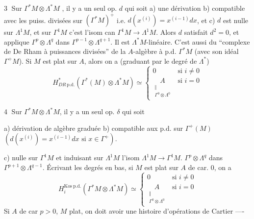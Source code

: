 \textcircled{3} Sur $\Gamma^*M\otimes\Lambda^*M$ , il y a un seul op. $d$ qui soit  a) une dérivation     b) compatible avec les puiss. divisées sur $(\Gamma^*M)^+$ i.e. $d(x^{(i)})=x^{(i-1)}dx$, et c) $d$ est nulle sur $\Lambda^1M$, et sur $\Gamma^1M$ c'est l'isom can $\Gamma^1M\longrightarrow\Lambda^1M$. Alors $d$ satisfait $d^2=0$, et applique $\Gamma^p\otimes\Lambda^q$ dans $\Gamma^{p-1}\otimes\Lambda^{q+1}$. Il est $\Lambda^*M$-linéaire. C'est aussi du ``complexe de De Rham à puissances divisées'' de la $A$-algèbre à p.d. $\Gamma^*M$ (avec son idéal $\Gamma^+M$).
Si $M$ est plat sur $A$, alors on a (graduant par le degré de $\Lambda^*$)
\[
H^*_{DR\,\mathrm{p.d.}}(\Gamma^*(M)\otimes\Lambda^*M)\simeq
\begin{cases}0&\text{si }i\neq0\\
\underset{\substack{\Vert\\\Gamma^0\otimes\Lambda^0}}{A}&\text{si }i=0
\end{cases}
\]

\textcircled{4} Sur $\Gamma^*M\otimes\Lambda^*M$, il y a un seul op. $\delta$ qui soit

a) dérivation de algèbre graduée b) compatible aux p.d. sur $\Gamma^+(M)$ $(d(x^{(i)})=x^{(i-1)}dx\text{ si }x\in\Gamma^+)$.

c) nulle sur $\Gamma^1M$  et induisant sur $\Lambda^1M$ l'isom $\Lambda^1M\longrightarrow\Gamma^1M$.    $\Gamma^p\otimes\Lambda^q$ dans $\Gamma^{p+1}\otimes\Lambda^{q-1}$. 
Écrivant les degrés  en bas, si $M$ est plat sur $A$ de car. $0$, on a
\[
H_i^{\mathrm{Kos\ p.d.}}(\Gamma^*M\otimes\Lambda^*M)\simeq
\begin{cases}0&\text{si }i\neq0\\
\underset{\substack{\Vert\\\Gamma^0\otimes\Lambda^0}}{A}&\text{si }i=0
\end{cases}
\]
Si $A$ de car $p>0$, $M$ plat, on doit avoir une histoire d'opérations de Cartier ----

